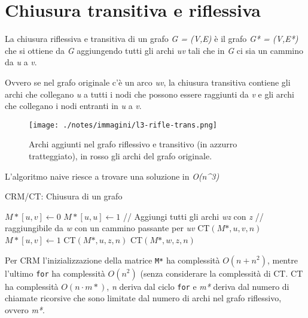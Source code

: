 
\section{Chiusura transitiva e riflessiva}\label{chiusura-transitiva-e-riflessiva}

La chiusura riflessiva e transitiva di un grafo \emph{G = (V,E)} è il
grafo \emph{G* = (V,E*)} che si ottiene da \emph{G} aggiungendo tutti
gli archi \emph{uv} tali che in \emph{G} ci sia un cammino da \emph{u} a
\emph{v}.

Ovvero se nel grafo originale c'è un arco \emph{uv}, la chiusura
transitiva contiene gli archi che collegano \emph{u} a tutti i nodi che
possono essere raggiunti da \emph{v} e gli archi che collegano i nodi
entranti in \emph{u} a \emph{v}.

\begin{figure}[htbp]
\centering
\texttt{[image: ./notes/immagini/l3-rifle-trans.png]}
\caption{Archi aggiunti nel grafo riflessivo e transitivo (in azzurro
tratteggiato), in rosso gli archi del grafo originale.}
\end{figure}

L'algoritmo naive riesce a trovare una soluzione in \emph{O(n\^{}3)}

\begin{breakablealgorithm}
	\caption{CRM/CT: Chiusura di un grafo}
	\begin{algorithmic}[1]
					\State $M*[u,v] \gets 0$
				\EndFor
			\EndFor
				\State $M*[u,u] \gets 1$
			\EndFor
				\State // Aggiungi tutti gli archi \textit{wz} con \textit{z}
				\State // raggiungibile da \textit{w} con un cammino passante per \textit{uv}
				\State \textsc{CT}$(M*,u,v,n)$
				\EndFor
			\EndFor
		\EndFunction
		\Statex
			\State $M*[u,v] \gets 1$
					\State \textsc{CT}$(M*, u, z, n)$
				\EndIf
			\EndFor
					\State \textsc{CT}$(M*, w, z, n)$
				\EndIf
			\EndFor
		\EndFunction
	\end{algorithmic}
\end{breakablealgorithm}

Per \textsc{CRM} l'inizializzazione della matrice \texttt{M*} ha
complessità $O(n+n^2)$, mentre l'ultimo
\texttt{for} ha complessità $O(n^2)$ (senza considerare la complessità
di \textsc{CT}. \textsc{CT} ha complessità $O(n \cdot m* )$, \emph{n}
deriva dal ciclo \texttt{for} e \emph{m*} deriva dal numero di chiamate
ricorsive che sono limitate dal numero di archi nel grafo riflessivo,
ovvero \emph{m*}.

